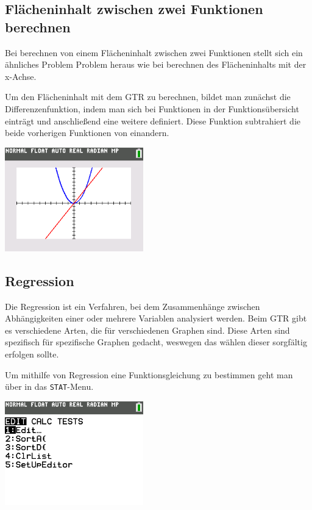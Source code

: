 \subsection{Flächeninhalt zwischen zwei Funktionen berechnen}\label{sec:Flaecheninhalt zwischen zwei Funktionen berechnen}
Bei berechnen von einem Flächeninhalt zwischen zwei Funktionen stellt sich ein ähnliches Problem Problem heraus wie bei berechnen des Flächeninhalts mit der x-Achse.
\begin{paracol}{2}
	\begin{flushleft}
	Um den Flächeninhalt mit dem GTR zu berechnen, bildet man zunächst die Differenzenfunktion, indem man sich bei Funktionen in der Funktionsübersicht einträgt und anschließend eine weitere definiert. Diese Funktion subtrahiert die beide vorherigen Funktionen von einandern. 
	\end{flushleft}
\switchcolumn
	\begin{flushright}
			\includegraphics[width=6cm]{Media/GRT/Visualisierung/Flaecheninhalt_zwischen_zwei_Funktionen_berechnen/Flaecheninhalt_zwischen_zwei_Funktionen_berechnen.png}
	\end{flushright}
\end{paracol}
\pagebreak
\subsection{Regression}\label{sec:Regression}
Die Regression ist ein Verfahren, bei dem Zusammenhänge zwischen Abhängigkeiten einer oder mehrere Variablen analysiert werden. Beim GTR gibt es verschiedene Arten, die für verschiedenen Graphen sind. Diese Arten sind spezifisch für spezifische Graphen gedacht, weswegen das wählen dieser sorgfältig erfolgen sollte. 

\begin{paracol}{2}
\begin{flushleft}
	Um mithilfe von Regression eine Funktionsgleichung zu bestimmen geht man über  in das \texttt{STAT}-Menu.
\end{flushleft}	
\switchcolumn
\begin{flushright}
	\includegraphics[width=6cm]{Media/GRT/Visualisierung/Regression/Regression_1.png}
\end{flushright}
\end{paracol}

